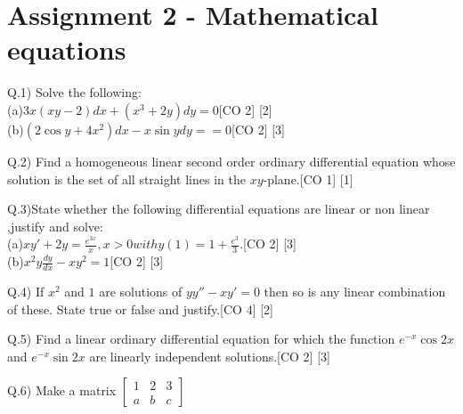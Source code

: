 \documentclass[12pt]{article}
\begin{document}
\newpage
\section{Assignment 2 - Mathematical equations}
\begin{flushleft}
Q.1) Solve the following:\\[10pt]
(a)$3x(xy-2)dx+(x^3+2y)dy=0$\hspace{5.5cm}[CO 2] [2]\\[6 pt]
(b)$(2\cos{y} + 4x^2)dx -x\sin{y}dy==0$\hspace{4.65cm}[CO 2]    [3]\\
\end{flushleft} 



\begin{flushleft}
 Q.2) Find a homogeneous linear second order ordinary differential equation whose solution is the set of all straight lines in the $xy$-plane.\hspace{1cm}[CO 1] [1]\\ 
\end{flushleft}

\begin{flushleft}
 Q.3)State whether the following differential equations are linear or non linear ,justify and solve:\\[10pt]
(a)$xy'+2y = \frac{e^{3x}}{x}, x>0 with y(1)=1+\frac{e^3}{3}. $\hspace{3.5cm}[CO 2] [3]\\[6 pt]
(b)$x^2y\frac{dy}{dx}- xy^2 = 1$\hspace{7.05cm}[CO 2] [3]
\end{flushleft}

\begin{flushleft}
Q.4) If $x^2$ and $1$ are solutions of $yy''-xy'=0$ then so is any linear combination of these. State true or false and justify.\hspace{2cm}[CO 4] [2]
\end{flushleft}

\begin{flushleft}
Q.5) Find a linear ordinary differential equation for which the function $e^{-x}\cos{2x}$ and $e^{-x}\sin{2x}$ are linearly independent solutions.\hspace{0.7cm}[CO 2] [3]
\end{flushleft}


Q.6) Make a matrix
$\begin{bmatrix}
1 & 2 & 3 \\
a & b & c
\end{bmatrix}$
\end{document}
